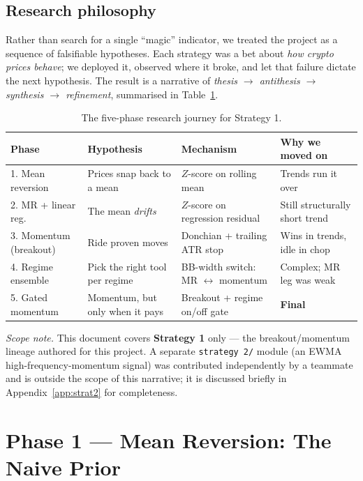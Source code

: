 \documentclass[11pt,a4paper]{article}
\newcommand{\code}[1]{\texttt{#1}}
\begin{document}
\subsection{Research philosophy}
Rather than search for a single ``magic'' indicator, we treated the project as a
sequence of falsifiable hypotheses. Each strategy was a bet about \emph{how crypto
prices behave}; we deployed it, observed where it broke, and let that failure
dictate the next hypothesis. The result is a narrative of
\emph{thesis $\rightarrow$ antithesis $\rightarrow$ synthesis $\rightarrow$
refinement}, summarised in Table~\ref{tab:journey}.

\begin{table}[h]
\centering
\small
\begin{tabular}{@{}llll@{}}
\toprule
\textbf{Phase} & \textbf{Hypothesis} & \textbf{Mechanism} & \textbf{Why we moved on} \\
\midrule
1. Mean reversion       & Prices snap back to a mean      & $Z$-score on rolling mean        & Trends run it over \\
2. MR + linear reg.     & The mean \emph{drifts}          & $Z$-score on regression residual & Still structurally short trend \\
3. Momentum (breakout)  & Ride proven moves               & Donchian + trailing ATR stop     & Wins in trends, idle in chop \\
4. Regime ensemble      & Pick the right tool per regime  & BB-width switch: MR $\leftrightarrow$ momentum & Complex; MR leg was weak \\
5. Gated momentum       & Momentum, but only when it pays & Breakout + regime on/off gate    & \textbf{Final} \\
\bottomrule
\end{tabular}
\caption{The five-phase research journey for Strategy 1.}
\label{tab:journey}
\end{table}

\noindent
\textit{Scope note.} This document covers \textbf{Strategy 1} only --- the
breakout/momentum lineage authored for this project. A separate
\code{strategy 2/} module (an EWMA high-frequency-momentum signal) was contributed
independently by a teammate and is outside the scope of this narrative; it is
discussed briefly in Appendix~\ref{app:strat2} for completeness.

\section{Phase 1 --- Mean Reversion: The Naive Prior}
\end{document}
